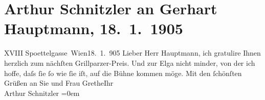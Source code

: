 

         
         \newcommand{\erwaehntePersonen}{Personen: Gerhart Hauptmann, Margarete Hauptmann}
         \newcommand{\erwaehnteInstitutionen}{Institutionen: Franz-Grillparzer-Preis}
         \newcommand{\erwaehnteOrte}{Orte: Edmund-Weiß-Gasse, Wien}
         \newcommand{\erwaehnteWerke}{Werke: Elga}
               \section[Arthur Schnitzler an Gerhart Hauptmann, 18. 1. 1905]{ Arthur Schnitzler an Gerhart Hauptmann, 18. 1. 1905}\nopagebreak{}\rehead{ }\begin{ledgroupsized}[t]{13cm}\normalsize\beginnumbering \toendnotes[C]{\smallbreak\pagebreak[2]} 
\toendnotes[C]{\smallbreak}\pstart
           \raggedleft{}{\pb}XVIII Spoettelgasse \label{T_L01491_1v}\label{T_L01491_1h}Wien18. 1. 905\pend
           \pstart{}Lieber Herr Hauptmann,\pend\pstart
           ich gratulire Ihnen herzlich zum nächſten Grillparzer-Preis. Und zur Elga nicht
               minder, von der ich hoffe, daſs ſie ſo wie ſie iſt, auf die Bühne kommen möge.\pend
           \pstart
           Mit den ſchönſten Grüßen an Sie und Frau GretheIhr{\\[\baselineskip]}Arthur Schnitzler\pend
           \leftskip=0em{}
         
         \endnumbering{}\end{ledgroupsized}  \newcommand{\dateiname}{L01491}\newcommand{\titel}{Arthur Schnitzler an Gerhart Hauptmann, 18. 1. 1905}\newcommand{\editorInnen}{ Martin Anton Müller und Gerd-Hermann Susen}
      